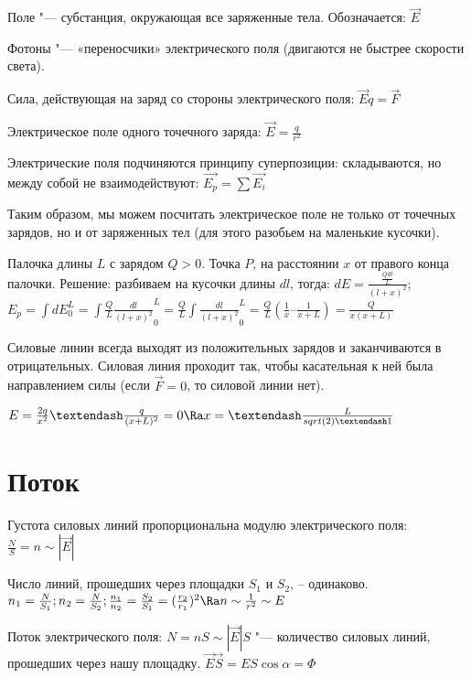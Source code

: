 Поле "--- субстанция, окружающая все заряженные тела. Обозначается: $\overrightarrow{E}$

Фотоны "--- «переносчики» электрического поля (двигаются не быстрее скорости света).

Сила, действующая на заряд со стороны электрического поля: $\overrightarrow{E}q = \overrightarrow{F}$

Электрическое поле одного точечного заряда: $\overrightarrow{E} = \frac{q}{r^2}$

Электрические поля подчиняются принципу суперпозиции: складываются, но между собой не взаимодействуют: $\overrightarrow{E_p} = \sum{\overrightarrow{E_i}}$

Таким образом, мы можем посчитать электрическое поле не только от точечных зарядов, но и от заряженных тел (для этого разобьем на маленькие кусочки).

\begin{exmp}
  Палочка длины $L$ с зарядом $Q > 0$. Точка $P$, на расстоянии $x$ от правого конца палочки.
  Решение: разбиваем на кусочки длины $dl$, тогда: $dE = \frac{\frac{Qdl}{L}}{(l + x)^2}$; $E_p = \int{dE}_0^L = \int{\frac{Q}{L}\frac{dl}{(l + x)^2}}_0^L = \frac{Q}{L}\int{\frac{dl}{(l + x)^2}}_0^L  = \frac{Q}{L}(\frac{1}{x} – \frac{1}{x + L}) = \frac{Q}{x(x + L)}$
\end{exmp}


Силовые линии всегда выходят из положительных зарядов и заканчиваются в отрицательных. Силовая линия проходит так, чтобы касательная к ней была направлением силы (если $\overrightarrow{F} = 0$, то силовой линии нет).

\begin{exmp}
 $E = \frac{2q}{x^2} – \frac{q}{(x + L)^2} = 0 \Ra x = – \frac{L}{sqrt(2) – 1}$
\end{exmp}



\section{Поток}
Густота силовых линий пропорциональна модулю электрического поля: $\frac{N}{S} = n \sim |\overrightarrow{E}|$


Число линий, прошедших через площадки $S_1$ и $S_2$, – одинаково. $n_1 = \frac{N}{S_1}; n_2 = \frac{N}{S_2}; \frac{n_1}{n_2} = \frac{S_2}{S_1} = (\frac{r_2}{r_1})^2 \Ra n \sim \frac{1}{r^2} \sim E$


Поток электрического поля: $N = nS \sim |\overrightarrow{E}|S$ "--- количество силовых линий, прошедших через нашу площадку. $\overrightarrow{E}\overrightarrow{S} = ES\cos{\alpha} = \Phi$

